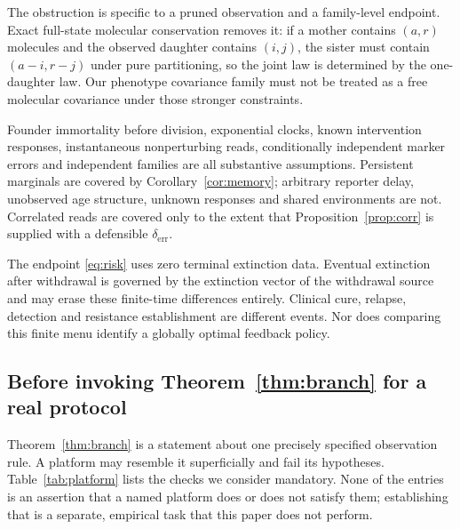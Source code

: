 \documentclass[11pt]{article}
\theoremstyle{plain}
\theoremstyle{definition}
\theoremstyle{remark}
\begin{document}
The obstruction is specific to a pruned observation and a family-level
endpoint. Exact full-state molecular conservation removes it: if a mother
contains $(a,r)$ molecules and the observed daughter contains $(i,j)$, the
sister must contain $(a-i,r-j)$ under pure partitioning, so the joint law is
determined by the one-daughter law. Our phenotype covariance family must not be
treated as a free molecular covariance under those stronger constraints.

Founder immortality before division, exponential clocks, known intervention
responses, instantaneous nonperturbing reads, conditionally independent marker
errors and independent families are all substantive assumptions. Persistent
marginals are covered by Corollary~\ref{cor:memory}; arbitrary reporter delay,
unobserved age structure, unknown responses and shared environments are not.
Correlated reads are covered only to the extent that
Proposition~\ref{prop:corr} is supplied with a defensible $\delta_{\mathrm{err}}$.

The endpoint \eqref{eq:risk} uses zero terminal extinction data. Eventual
extinction after withdrawal is governed by the extinction vector of the
withdrawal source and may erase these finite-time differences entirely.
Clinical cure, relapse, detection and resistance establishment are different
events. Nor does comparing this finite menu identify a globally optimal feedback
policy.

\subsection{Before invoking Theorem~\ref{thm:branch} for a real protocol}

Theorem~\ref{thm:branch} is a statement about one precisely specified
observation rule. A platform may resemble it superficially and fail its
hypotheses. Table~\ref{tab:platform} lists the checks we consider mandatory.
None of the entries is an assertion that a named platform does or does not
satisfy them; establishing that is a separate, empirical task that this paper
does not perform.
\end{document}
